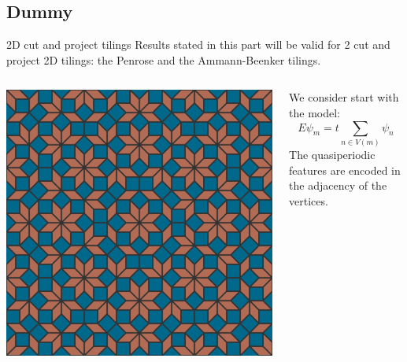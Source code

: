 \documentclass[xcolor=x11names,compress,professionalfonts]{beamer}
\renewcommand{\(}{\begin{columns}}
\renewcommand{\)}{\end{columns}}
\newcommand{\<}[1]{\begin{column}{#1}}
\renewcommand{\>}{\end{column}}
\begin{document}
\subsection{Dummy}

\begin{frame}{2D cut and project tilings}
Results stated in this part will be valid for 2 cut and project 2D tilings: the Penrose and the Ammann-Beenker tilings.
\begin{columns}
\begin{column}{5cm}
{\centering
\includegraphics[scale=.1]{img/ammann-beenker.png}

}
\end{column}
\begin{column}{5cm}
We consider start with the model:
\[
	E \psi_m = t\sum_{n \in V(m)} \psi_n
\]
The quasiperiodic features are encoded in the adjacency of the vertices.
\end{column}
\end{columns}
\end{frame}
\end{document}
